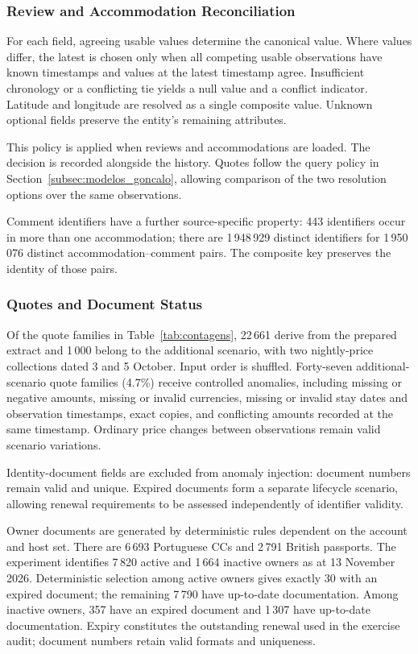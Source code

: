 \subsubsection{Review and Accommodation Reconciliation}
For each field, agreeing usable values determine the canonical value. Where values differ, the latest is chosen only when all competing usable observations have known timestamps and values at the latest timestamp agree. Insufficient chronology or a conflicting tie yields a null value and a conflict indicator. Latitude and longitude are resolved as a single composite value. Unknown optional fields preserve the entity's remaining attributes.

This policy is applied when reviews and accommodations are loaded. The decision is recorded alongside the history. Quotes follow the query policy in Section~\ref{subsec:modelos_goncalo}, allowing comparison of the two resolution options over the same observations.

Comment identifiers have a further source-specific property: 443 identifiers occur in more than one accommodation; there are 1\,948\,929 distinct identifiers for 1\,950\,076 distinct accommodation--comment pairs. The composite key preserves the identity of those pairs.
\subsubsection{Quotes and Document Status}
Of the quote families in Table~\ref{tab:contagens}, 22\,661 derive from the prepared extract and 1\,000 belong to the additional scenario, with two nightly-price collections dated 3 and 5 October. Input order is shuffled. Forty-seven additional-scenario quote families (4.7\%) receive controlled anomalies, including missing or negative amounts, missing or invalid currencies, missing or invalid stay dates and observation timestamps, exact copies, and conflicting amounts recorded at the same timestamp. Ordinary price changes between observations remain valid scenario variations.

Identity-document fields are excluded from anomaly injection: document numbers remain valid and unique. Expired documents form a separate lifecycle scenario, allowing renewal requirements to be assessed independently of identifier validity.

Owner documents are generated by deterministic rules dependent on the account and host set. There are 6\,693 Portuguese CCs and 2\,791 British passports. The experiment identifies 7\,820 active and 1\,664 inactive owners as at 13 November 2026. Deterministic selection among active owners gives exactly 30 with an expired document; the remaining 7\,790 have up-to-date documentation. Among inactive owners, 357 have an expired document and 1\,307 have up-to-date documentation. Expiry constitutes the outstanding renewal used in the exercise audit; document numbers retain valid formats and uniqueness.
